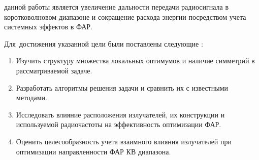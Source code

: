 
{\aim} данной работы является увеличение
дальности передачи радиосигнала в коротковолновом диапазоне и сокращение расхода энергии посредством учета системных эффектов в ФАР.

Для~достижения указанной цели были поставлены следующие {\tasks}:
\begin{enumerate}[beginpenalty=10000] %
  \item Изучить структуру множества локальных оптимумов и наличие симметрий в рассматриваемой задаче.
  \item Разработать алгоритмы решения задачи и сравнить их с известными методами.
  \item Исследовать влияние расположения излучателей, их конструкции и используемой радиочастоты на эффективность оптимизации ФАР.
  \item Оценить целесообразность учета взаимного влияния излучателей при оптимизации направленности ФАР КВ диапазона.
\end{enumerate}


{\novelty}


